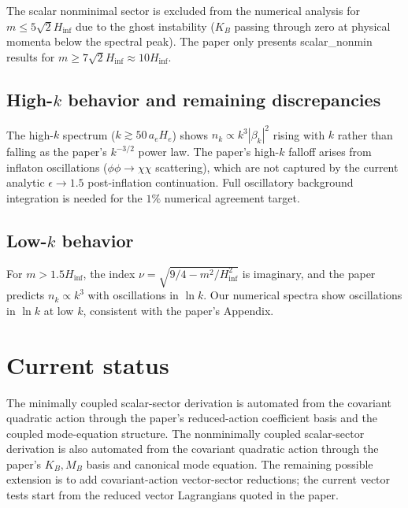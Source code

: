 \documentclass[11pt]{article}
\begin{document}
The scalar nonminimal sector is excluded from the numerical analysis for $m \leq 5\sqrt{2}H_\mathrm{inf}$ due to the ghost instability ($K_B$ passing through zero at physical momenta below the spectral peak). The paper only presents scalar\_nonmin results for $m \geq 7\sqrt{2}H_\mathrm{inf}\approx 10 H_\mathrm{inf}$.

\subsection{High-$k$ behavior and remaining discrepancies}
The high-$k$ spectrum ($k \gtrsim 50\,a_e H_e$) shows $n_k \propto k^3 |\beta_k|^2$ rising with $k$ rather than falling as the paper's $k^{-3/2}$ power law. The paper's high-$k$ falloff arises from inflaton oscillations ($\phi\phi\to\chi\chi$ scattering), which are not captured by the current analytic $\epsilon\to1.5$ post-inflation continuation. Full oscillatory background integration is needed for the $1\%$ numerical agreement target.

\subsection{Low-$k$ behavior}
For $m > 1.5 H_\mathrm{inf}$, the index $\nu = \sqrt{9/4 - m^2/H_\mathrm{inf}^2}$ is imaginary, and the paper predicts $n_k \propto k^3$ with oscillations in $\ln k$. Our numerical spectra show oscillations in $\ln k$ at low $k$, consistent with the paper's Appendix.

\section{Current status}
The minimally coupled scalar-sector derivation is automated from the covariant quadratic action through the paper's reduced-action coefficient basis and the coupled mode-equation structure. The nonminimally coupled scalar-sector derivation is also automated from the covariant quadratic action through the paper's \(K_B,M_B\) basis and canonical mode equation. The remaining possible extension is to add covariant-action vector-sector reductions; the current vector tests start from the reduced vector Lagrangians quoted in the paper.
\end{document}
